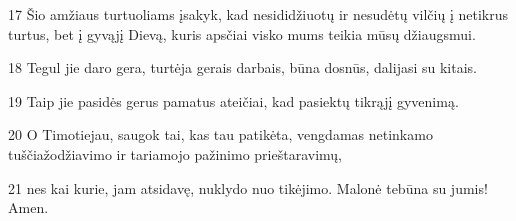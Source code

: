 \par 17 Šio amžiaus turtuoliams įsakyk, kad nesididžiuotų ir nesudėtų vilčių į netikrus turtus, bet į gyvąjį Dievą, kuris apsčiai visko mums teikia mūsų džiaugsmui. 
\par 18 Tegul jie daro gera, turtėja gerais darbais, būna dosnūs, dalijasi su kitais. 
\par 19 Taip jie pasidės gerus pamatus ateičiai, kad pasiektų tikrąjį gyvenimą. 
\par 20 O Timotiejau, saugok tai, kas tau patikėta, vengdamas netinkamo tuščiažodžiavimo ir tariamojo pažinimo prieštaravimų, 
\par 21 nes kai kurie, jam atsidavę, nuklydo nuo tikėjimo. Malonė tebūna su jumis! Amen.


